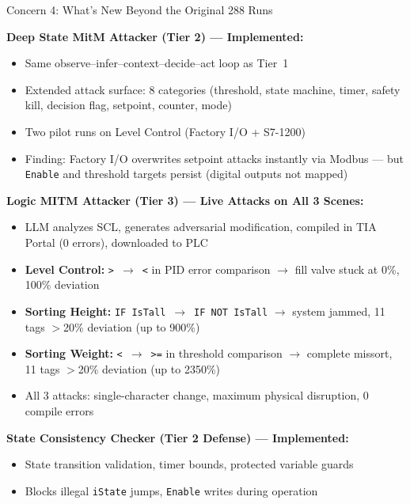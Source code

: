 \documentclass[aspectratio=169,10pt]{beamer}
\begin{document}
\begin{frame}{Concern 4: What's New Beyond the Original 288 Runs}

\textbf{Deep State MitM Attacker (Tier 2) — Implemented:}
\begin{itemize}
    \item Same observe--infer--context--decide--act loop as Tier~1
    \item Extended attack surface: 8 categories (threshold, state machine, timer, safety kill, decision flag, setpoint, counter, mode)
    \item Two pilot runs on Level Control (Factory I/O + S7-1200)
    \item Finding: Factory I/O overwrites setpoint attacks instantly via Modbus — but \texttt{Enable} and threshold targets persist (digital outputs not mapped)
\end{itemize}

\vspace{0.5em}
\textbf{Logic MITM Attacker (Tier 3) — Live Attacks on All 3 Scenes:}
\begin{itemize}
    \item LLM analyzes SCL, generates adversarial modification, compiled in TIA Portal (0 errors), downloaded to PLC
    \item \textbf{Level Control:} \texttt{>}~$\rightarrow$~\texttt{<} in PID error comparison $\rightarrow$ fill valve stuck at 0\%, 100\% deviation
    \item \textbf{Sorting Height:} \texttt{IF IsTall}~$\rightarrow$~\texttt{IF NOT IsTall} $\rightarrow$ system jammed, 11 tags $>$20\% deviation (up to 900\%)
    \item \textbf{Sorting Weight:} \texttt{<}~$\rightarrow$~\texttt{>=} in threshold comparison $\rightarrow$ complete missort, 11 tags $>$20\% deviation (up to 2350\%)
    \item All 3 attacks: single-character change, maximum physical disruption, 0 compile errors
\end{itemize}

\vspace{0.5em}
\textbf{State Consistency Checker (Tier 2 Defense) — Implemented:}
\begin{itemize}
    \item State transition validation, timer bounds, protected variable guards
    \item Blocks illegal \texttt{iState} jumps, \texttt{Enable} writes during operation
\end{itemize}
\end{frame}
\end{document}
